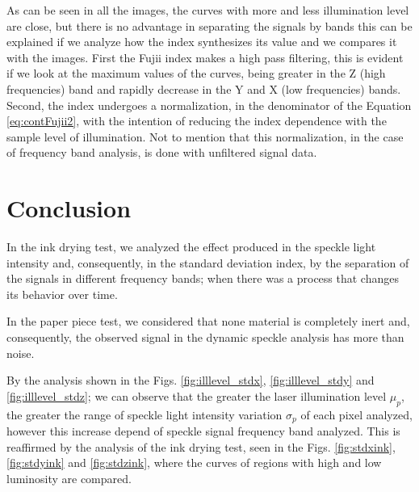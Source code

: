 \documentclass[review]{elsarticle}
\begin{document}
As can be seen in all the images, the curves with more and less  illumination level are close,
but there is no advantage in separating the signals by bands
this can be explained if we analyze how the index synthesizes its value and we compares it with the images.
First the Fujii index makes a high pass filtering,
this is evident if we look at the maximum values of the curves,
being greater in the Z (high frequencies) band and rapidly decrease in the Y and X (low frequencies) bands.
Second, the index undergoes a normalization, in the denominator of the Equation \ref{eq:contFujii2},
with the intention of reducing the index dependence with the sample level of illumination.
Not to mention that this normalization, in the case of frequency band analysis, is done with unfiltered signal data.

\section{Conclusion} 

In the ink drying test, 
we analyzed the effect produced in  the speckle light intensity and, consequently, in the standard deviation index, 
by the separation of the signals in different frequency bands;
when there was a process that changes its behavior over time.

In the paper piece test, we considered that none material is completely inert and, consequently, 
the observed signal  in the  dynamic speckle analysis has more than noise.


By the analysis shown in the Figs. \ref{fig:illlevel_stdx}, \ref{fig:illlevel_stdy} and \ref{fig:illlevel_stdz};
we can observe that the greater the laser illumination level $\mu_p$, 
the greater the range of speckle light intensity variation $\sigma_p$ of each pixel analyzed, 
however this increase depend of speckle signal frequency band analyzed.
This is reaffirmed by the analysis of the ink drying test, 
seen in the Figs. \ref{fig:stdxink}, \ref{fig:stdyink} and \ref{fig:stdzink},
where the curves of regions with high and low luminosity are compared.
\end{document}
